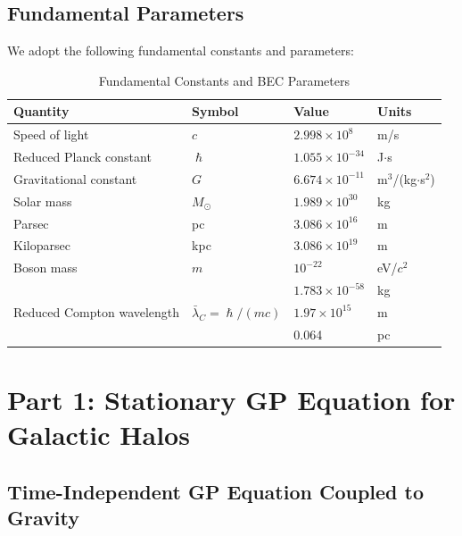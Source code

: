 \documentclass[11pt,a4paper]{article}
\newcommand{\ee}[1]{\times 10^{#1}}
\newcommand{\hbar}{\ensuremath{\hslash}}
\newcommand{\Msun}{\ensuremath{M_{\odot}}}
\theoremstyle{definition}
\theoremstyle{remark}
\begin{document}
\subsection{Fundamental Parameters}

We adopt the following fundamental constants and parameters:

\begin{table}[H]
\centering
\caption{Fundamental Constants and BEC Parameters}
\label{tab:constants}
\begin{tabular}{@{}llll@{}}
\toprule
\textbf{Quantity} & \textbf{Symbol} & \textbf{Value} & \textbf{Units} \\
\midrule
Speed of light & $c$ & $2.998 \ee{8}$ & m/s \\
Reduced Planck constant & $\hbar$ & $1.055 \ee{-34}$ & J$\cdot$s \\
Gravitational constant & $G$ & $6.674 \ee{-11}$ & m$^3$/(kg$\cdot$s$^2$) \\
Solar mass & $\Msun$ & $1.989 \ee{30}$ & kg \\
Parsec & pc & $3.086 \ee{16}$ & m \\
Kiloparsec & kpc & $3.086 \ee{19}$ & m \\
\midrule
Boson mass & $m$ & $10^{-22}$ & eV/$c^2$ \\
 & & $1.783 \ee{-58}$ & kg \\
Reduced Compton wavelength & $\bar{\lambda}_C = \hbar/(mc)$ & $1.97 \ee{15}$ & m \\
 & & 0.064 & pc \\
\bottomrule
\end{tabular}
\end{table}

\section{Part 1: Stationary GP Equation for Galactic Halos}
\label{sec:stationary_GP}

\subsection{Time-Independent GP Equation Coupled to Gravity}
\label{sec:GP_gravity}
\end{document}
